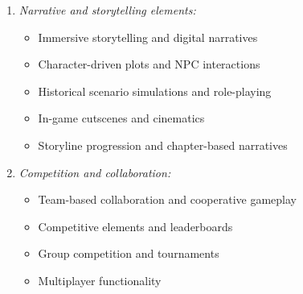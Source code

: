 \documentclass[a4paper,fleqn]{cas-sc}
\begin{document}
\begin{enumerate}[noitemsep]
	\item 
\textit{Narrative and storytelling elements:}
\begin{itemize}[noitemsep]
 \item Immersive storytelling and digital narratives \citep{1Barbatsis201159, 5kazanidis2018alpha, 12Gilbert2019108, 15Slater2022, 17Manzanares2019, 23Zin2009322, 39Tegos2014838, 47Clara2010156, 64Hsu201324, 71lynch2015pedagogical, 80gottlieb2018your}
 \item Character-driven plots and NPC interactions \citep{2Mahamarowi2023133, 9Lin2018, 12Gilbert2019108, 18Shih201054, 20Erandaru2014, 55Squire2004, 63Liu2021}
 \item Historical scenario simulations and role-playing \citep{3Watson2011466, 8Yu2014, 16Chen201447, 18Shih201054, 42Huffer201581, 43ali2018indonesian, 45Yu2016727, 48Moketar2021, 64Hsu201324, 71lynch2015pedagogical, 78Rouse2022357}
 \item In-game cutscenes and cinematics \citep{2Mahamarowi2023133}
 \item Storyline progression and chapter-based narratives \citep{18Shih201054, 39Tegos2014838, 80gottlieb2018your}
\end{itemize}

	\item 
\textit{Competition and collaboration:}
\begin{itemize}[noitemsep]
 \item Team-based collaboration and cooperative gameplay \citep{3Watson2011466, 6Czerwinski2018, 29Stiso20201165, 40Kuran2018, 47Clara2010156, 54Gibson2007, 60Hoy2018, 62Milosz201896, 70Hou201519, 71lynch2015pedagogical, 73Wolfartsberger2011160}
 \item Competitive elements and leaderboards \citep{4Cruz2017, 6Czerwinski2018, 28Chao201734, 40Kuran2018, 43ali2018indonesian, 62Milosz201896, 70Hou201519, 72hutauruk2020utilization, 73Wolfartsberger2011160, 75trajano2014using}
 \item Group competition and tournaments \citep{28Chao201734, 30Zin2008, 67Lin201296, 72hutauruk2020utilization, 77Ramansyah2021, 79Fernes2024379}
 \item Multiplayer functionality \citep{13Humpire2022, 40Kuran2018, 58Shih2015173, 73Wolfartsberger2011160}
\end{itemize}


\end{enumerate}
\end{document}
